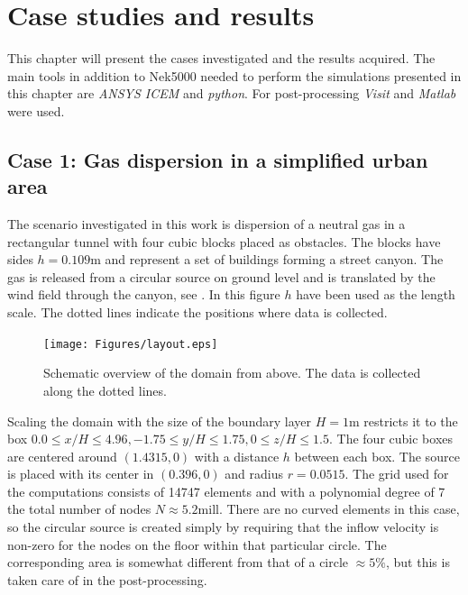 
\chapter{Case studies and results} %

\label{results} %



This chapter will present the cases investigated and the results acquired.
The main tools in addition to Nek5000 needed to perform the simulations presented in this 
chapter are \textit{ANSYS ICEM} and \textit{python}. For post-processing \textit{Visit} and
\textit{Matlab} were used.
%
\section{Case 1: Gas dispersion in a simplified urban area} \label{case1}
The scenario investigated in this work is dispersion of a neutral gas in a rectangular tunnel
with four cubic blocks placed as obstacles. The blocks have sides $h = 0.109$m and represent a 
set of buildings forming a street canyon. The gas is released from a circular source on 
ground level and
is translated by the wind field through the canyon, see .
In this figure $h$ have been used as the length scale. The dotted lines
indicate the positions where data is collected.
%
\begin{figure}[h]
	\texttt{[image: Figures/layout.eps]}
	\caption{Schematic overview of the domain from above. The data is collected along the dotted lines.}
	\label{fig:layout}
\end{figure}
%

Scaling the domain with the size of the boundary layer $H =1$m restricts it to
the box $0.0\leq x/H \leq 4.96,-1.75\leq y/H \leq 1.75, 0\leq z/H \leq 1.5$.
The four cubic boxes are centered around $(1.4315,0)$ with a distance $h$ between each box.
The source is placed with its center in $(0.396,0)$ and radius $r = 0.0515$.
The grid used for the computations consists of 14747 elements and with a polynomial degree of
7 the total number of nodes $N\approx 5.2$mill. There are no curved elements in this case, so the 
circular source is created simply by requiring that the inflow velocity is non-zero for the nodes
on the floor within that particular circle. The corresponding area is somewhat different from that
of a circle $\approx 5 \%$, but this is taken care of in the post-processing.


